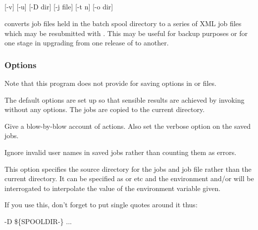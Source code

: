 \subsection{\XbCjlistxName}

\begin{expara}

\XbCjlistxName{} [-v] [-u] [-D dir] [-j file] [-t n] [-o dir]

\end{expara}

\PrXbCjlistx{} converts \ProductName{} job files held in the batch spool
directory to a series of XML job files which may be resubmitted with \PrBts.
This may be useful for backup purposes or for one stage in upgrading from one release of \ProductName{} to
another.

\subsubsection{Options}

Note that this program does not provide for saving options in \configurationfile{} or \homeconfigpath{} files.

The default options are set up so that sensible results are achieved by invoking \PrXbCjlistx{} without any options. The jobs are copied to the
current directory.



Give a blow-by-blow account of actions. Also set the verbose option on the saved jobs.


Ignore invalid user names in saved jobs rather than counting them as errors.


This option specifies the source directory for the jobs and job file
rather than the current directory. It can be specified as  or
 etc and the environment and/or \linebreak[3]\masterconfig{} will be
interrogated to interpolate the value of the environment variable given.

If you use this, don't forget to put single quotes around it thus:

\begin{expara}

\XbCjlistxName{} -D
{\textquotesingle}\$\{SPOOLDIR-\spooldirname\}{\textquotesingle}
...

\end{expara}

